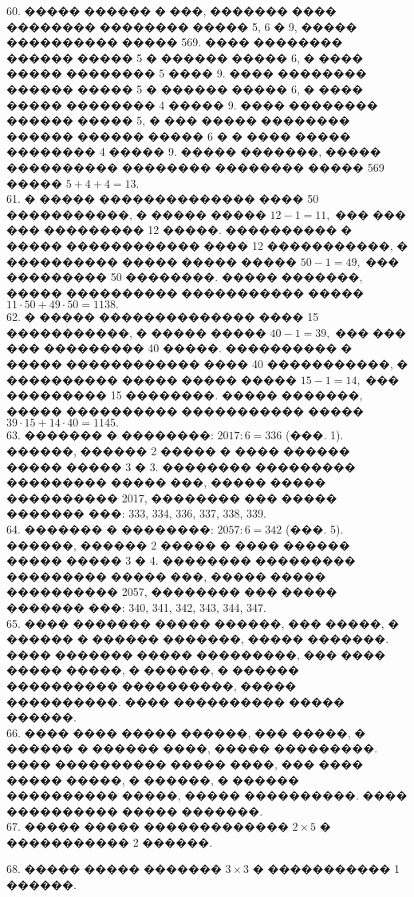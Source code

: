 \documentclass[12pt]{article}
\begin{document}
60. ����� ������ � ���, ������� ���� �������� �������� ����� 5, 6 � 9, ����� ���������� ����� 569. ���� �������� ������ ����� 5 � ������ ����� 6, � ���� ����� �������� 5 ���� 9. ���� �������� ������ ����� 5 � ������ ����� 6, � ���� ����� �������� 4 ����� 9. ���� �������� ������ ����� 5, � ��� ����� �������� ������ ������ ����� 6 � � ���� ����� �������� 4 ����� 9. ����� �������, ����� ���������� �������� �������� ����� 569 ����� $5+4+4=13.$\\
61. � ����� �������������� ���� 50 �����������, � ����� ����� $12-1=11,$ ��� ��� ��� ��������� 12 �����. ���������� � ����� ������������ ���� 12 �����������, � ���������� ����� ����� ����� $50-1=49,$ ��� ��������� 50 ��������. ����� �������, ����� ���������� ����������� ����� $11\cdot50+49\cdot50=1138.$\\
62. � ����� �������������� ���� 15 �����������, � ����� ����� $40-1=39,$ ��� ��� ��� ��������� 40 �����. ���������� � ����� ������������ ���� 40 �����������, � ���������� ����� ����� ����� $15-1=14,$ ��� ��������� 15 ��������. ����� �������, ����� ���������� ����������� ����� $39\cdot15+14\cdot40=1145.$\\
63. ������� � ��������: $2017:6=336$ (���. 1). ������, ������ 2 ����� � ���� ������ ����� ����� 3 � 3. �������� ��������� ��������� ����� ���, ����� ����� ���������� 2017, �������� ��� ����� ������� ���: 333, 334, 336, 337, 338, 339.\\
64. ������� � ��������: $2057:6=342$ (���. 5). ������, ������ 2 ����� � ���� ������ ����� ����� 3 � 4. �������� ��������� ��������� ����� ���, ����� ����� ���������� 2057, �������� ��� ����� ������� ���: 340, 341, 342, 343, 344, 347.\\
65. ���� ������� ����� ������, ��� �����, � ������ � ������ �������, ����� �������. ���� ������� ����� ���������, ��� ���� ����� �����, � ������, � ������ ���������� ����������, ����� ����������. ���� ���������� ����� ������.\\
66. ���� ���� ����� ������, ��� �����, � ������ � ������ ����, ����� ���������. ���� ���������� ����� ����, ��� ���� ����� �����, � ������, � ������ ���������� �����, ����� ����������. ���� ���������� ����� �������.\\
67. ����� ����� ������������� $2\times5$ � ����������� 2 ������.
\begin{center}
\begin{figure}[ht!]
\end{figure}
\end{center}
68. ����� ����� ������� $3\times3$ � ����������� 1 ������.
\end{document}
